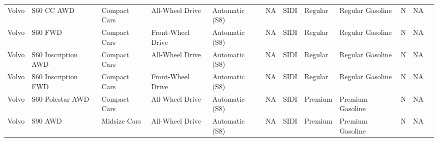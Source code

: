 \documentclass[11pt]{article}
\begin{document}
\begin{tabular}{r|lllllllllll}
	 Volvo                              & S60 CC AWD                         & Compact Cars                       & All-Wheel Drive                    & Automatic (S8)                     & NA                                 & SIDI                               & Regular                            & Regular Gasoline                   & N                                  & NA                                \\
	 Volvo                              & S60 FWD                            & Compact Cars                       & Front-Wheel Drive                  & Automatic (S8)                     & NA                                 & SIDI                               & Regular                            & Regular Gasoline                   & N                                  & NA                                \\
	 Volvo                              & S60 Inscription AWD                & Compact Cars                       & All-Wheel Drive                    & Automatic (S8)                     & NA                                 & SIDI                               & Regular                            & Regular Gasoline                   & N                                  & NA                                \\
	 Volvo                              & S60 Inscription FWD                & Compact Cars                       & Front-Wheel Drive                  & Automatic (S8)                     & NA                                 & SIDI                               & Regular                            & Regular Gasoline                   & N                                  & NA                                \\
	 Volvo                              & S60 Polestar AWD                   & Compact Cars                       & All-Wheel Drive                    & Automatic (S8)                     & NA                                 & SIDI                               & Premium                            & Premium Gasoline                   & N                                  & NA                                \\
	 Volvo                              & S90 AWD                            & Midsize Cars                       & All-Wheel Drive                    & Automatic (S8)                     & NA                                 & SIDI                               & Premium                            & Premium Gasoline                   & N                                  & NA                                \\

\end{tabular}
\end{document}
